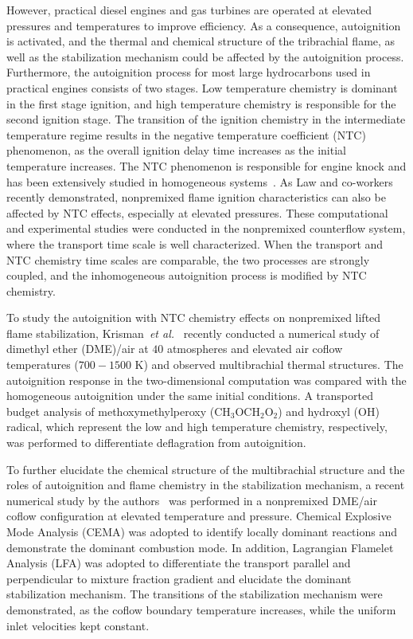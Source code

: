 \documentclass{wssci}
\begin{document}
However, practical diesel engines and gas turbines are operated at elevated pressures and temperatures to improve efficiency.  As a consequence, autoignition is activated, and the thermal and chemical structure of the tribrachial flame, as well as the stabilization mechanism could be affected by the autoignition process.  Furthermore, the autoignition process for most large hydrocarbons used in practical engines consists of two stages.  Low temperature chemistry is dominant in the first stage ignition, and high temperature chemistry is responsible for the second ignition stage.  The transition of the ignition chemistry in the intermediate temperature regime results in the negative temperature coefficient (NTC) phenomenon, as the overall ignition delay time increases as the initial temperature increases.  The NTC phenomenon is responsible for engine knock and has been extensively studied in homogeneous systems~\cite{zador11}.  As Law and co-workers~\cite{law12,zhao13,deng14} recently demonstrated, nonpremixed flame ignition characteristics can also be affected by NTC effects, especially at elevated pressures.  These computational and experimental studies were conducted in the nonpremixed counterflow system, where the transport time scale is well characterized.  When the transport and NTC chemistry time scales are comparable, the two processes are strongly coupled, and the inhomogeneous autoignition process is modified by NTC chemistry.

To study the autoignition with NTC chemistry effects on nonpremixed lifted flame stabilization, Krisman~\emph{et al.}~\cite{krisman14} recently conducted a numerical study of dimethyl ether (DME)/air at $40$ atmospheres and elevated air coflow temperatures ($700-1500$ K) and observed multibrachial thermal structures.  The autoignition response in the two-dimensional computation was compared with the homogeneous autoignition under the same initial conditions.  A transported budget analysis of methoxymethylperoxy (CH$_3$OCH$_2$O$_2$) and hydroxyl (OH) radical, which represent the low and high temperature chemistry, respectively, was performed to differentiate deflagration from autoignition.  

To further elucidate the chemical structure of the multibrachial structure and the roles of autoignition and flame chemistry in the stabilization mechanism, a recent numerical study by the authors~\cite{deng15} was performed in a nonpremixed DME/air coflow configuration at elevated temperature and pressure.  Chemical Explosive Mode Analysis (CEMA) was adopted to identify locally dominant reactions and demonstrate the dominant combustion mode.  In addition, Lagrangian Flamelet Analysis (LFA) was adopted to differentiate the transport parallel and perpendicular to mixture fraction gradient and elucidate the dominant stabilization mechanism.  The transitions of the stabilization mechanism were demonstrated, as the coflow boundary temperature increases, while the uniform inlet velocities kept constant.
\end{document}
